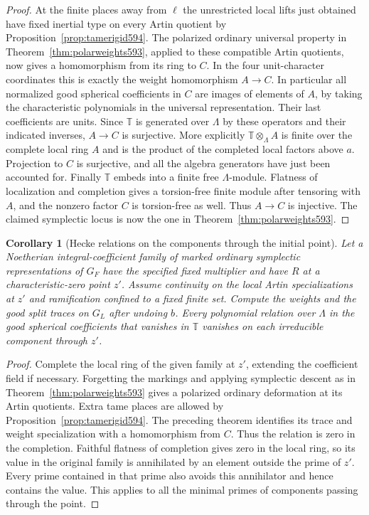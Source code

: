 \documentclass[a4paper,11pt]{article}
\newtheorem{corollary}[proposition]{Corollary}
\theoremstyle{definition}
\theoremstyle{remark}
\numberwithin{equation}{section}
\begin{document}
\begin{proof}
At the finite places away from \(\ell\) the unrestricted
local lifts just obtained have fixed inertial type on every
Artin quotient by Proposition~\ref{prop:tamerigid594}.
The polarized ordinary universal property in
Theorem~\ref{thm:polarweights593}, applied to these
compatible Artin quotients, now gives a homomorphism from
its ring to \(C\). In the four unit-character coordinates
this is exactly the weight homomorphism \(A\to C\).
In particular all normalized good spherical coefficients
in \(C\) are images of elements of \(A\), by taking the
characteristic polynomials in the universal representation.
Their last coefficients are units. Since \(\mathbb T\)
is generated over \(\Lambda\) by these operators and their
indicated inverses, \(A\to C\) is surjective. More
explicitly \(\mathbb T\otimes_\Lambda A\) is finite over
the complete local ring \(A\) and is the product of the
completed local factors above \(a\). Projection to \(C\)
is surjective, and all the algebra generators have just
been accounted for. Finally \(\mathbb T\) embeds into a
finite free \(\Lambda\)-module. Flatness of localization
and completion gives a torsion-free finite module after
tensoring with \(A\), and the nonzero factor \(C\) is
torsion-free as well. Thus \(A\to C\) is injective.
The claimed symplectic locus is now the one in
Theorem~\ref{thm:polarweights593}.
\end{proof}

\begin{corollary}[Hecke relations on the components through the initial point]
\leavevmode\label{cor:seedcomponents595}
Let a Noetherian integral-coefficient family of marked
ordinary symplectic representations of \(G_F\) have the
specified fixed multiplier and have \(R\) at a
characteristic-zero point \(z'\). Assume continuity on
the local Artin specializations at \(z'\) and ramification
confined to a fixed finite set. Compute the weights and
the good split traces on \(G_L\) after undoing \(b\).
Every polynomial relation over \(\Lambda\) in the good
spherical coefficients that vanishes in \(\mathbb T\)
vanishes on each irreducible component through \(z'\).
\end{corollary}
\begin{proof}
Complete the local ring of the given family at \(z'\),
extending the coefficient field if necessary. Forgetting
the markings and applying symplectic descent as in
Theorem~\ref{thm:polarweights593} gives a polarized
ordinary deformation at its Artin quotients. Extra tame
places are allowed by Proposition~\ref{prop:tamerigid594}.
The preceding theorem identifies its trace and weight
specialization with a homomorphism from \(C\). Thus the
relation is zero in the completion. Faithful flatness
of completion gives zero in the local ring, so its
value in the original family is annihilated by an element
outside the prime of \(z'\). Every prime contained in
that prime also avoids this annihilator and hence
contains the value. This applies to all the minimal
primes of components passing through the point.
\end{proof}
\end{document}
